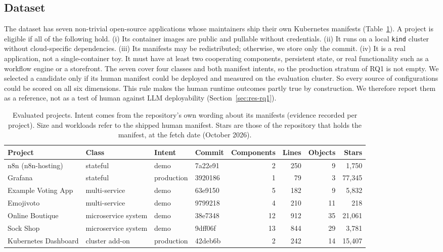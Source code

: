 \subsection{Dataset}\label{sec:method-dataset}

The dataset has seven non-trivial open-source applications whose maintainers ship their own Kubernetes manifests (Table~\ref{tab:dataset}). A project is eligible if all of the following hold. (i) Its container images are public and pullable without credentials. (ii) It runs on a local \texttt{kind} cluster \citep{tool_kind} without cloud-specific dependencies. (iii) Its manifests may be redistributed; otherwise, we store only the commit. (iv) It is a real application, not a single-container toy. It must have at least two cooperating components, persistent state, or real functionality such as a workflow engine or a storefront. The seven cover four classes and both manifest intents, so the production stratum of RQ1 is not empty. We selected a candidate only if its human manifest could be deployed and measured on the evaluation cluster. So every source of configurations could be scored on all six dimensions. This rule makes the human runtime outcomes partly true by construction. We therefore report them as a reference, not as a test of human against LLM deployability (Section~\ref{sec:res-rq1}).

\begin{table}[t]
\centering\small
\caption{Evaluated projects. Intent comes from the repository's own wording about its manifests (evidence recorded per project). Size and workloads refer to the shipped human manifest. Stars are those of the repository that holds the manifest, at the fetch date (October 2026).}\label{tab:dataset}
\begin{tabular}{llllrrrr}
\toprule
Project & Class & Intent & Commit & Components & Lines & Objects & Stars \\ \midrule
n8n (n8n-hosting) & stateful & demo & 7a22e91 & 2 & 250 & 9 & 1,750 \\
Grafana & stateful & production & 3920186 & 1 & 79 & 3 & 77,345 \\
Example Voting App & multi-service & demo & 63e9150 & 5 & 182 & 9 & 5,832 \\
Emojivoto & multi-service & demo & 9799218 & 4 & 210 & 11 & 218 \\
Online Boutique & microservice system & demo & 38e7348 & 12 & 912 & 35 & 21,061 \\
Sock Shop & microservice system & demo & 9dff06f & 13 & 844 & 29 & 3,781 \\
Kubernetes Dashboard & cluster add-on & production & 42deb6b & 2 & 242 & 14 & 15,407 \\
\bottomrule
\end{tabular}
\end{table}

